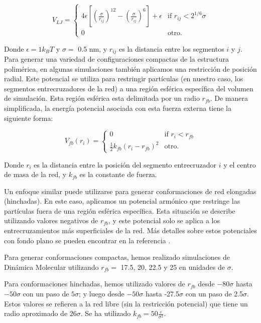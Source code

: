 \begin{equation}
	V_{LJ}=\begin{cases}
		4\epsilon \left[\left(\frac{\sigma}{r_{ij}}\right)^{12} - \left(\frac{\sigma}{r_{ij}}\right)^{6}\right] + \epsilon & \text{if $r_{ij} < 2^{1/6}\sigma$}\\
		0 & \text{otro}.
	\end{cases}
\end{equation}



Donde $\epsilon = 1 k_BT$ y $\sigma = $ 0.5 nm, y $r_{ij}$ es la distancia entre los segmentos $i$ y $j$.
Para generar una variedad de configuraciones compactas de la estructura polim\'erica, en algunas simulaciones tambi\'en aplicamos una restricci\'on de posici\'on radial.
Este potencial se utiliza para restringir part\'iculas (en nuestro caso, los segmentos entrecruzadores de la red) a una regi\'on esf\'erica espec\'ifica del volumen de simulaci\'on.
Esta regi\'on esf\'erica esta delimitada por un radio $r_{fb}$.
De manera simplificada, la energ\'ia potencial asociada con esta fuerza externa tiene la siguiente forma:

\begin{equation}
	V_{fb}(r_i)=\begin{cases}
		0 & \text{if $r_{i} < r_{fb}$}\\
		\frac{1}{2}k_{fb}\left(r_i -r_{fb}\right)^2 & \text{otro}.
	\end{cases}
\end{equation}


Donde $r_i$ es la distancia entre la posici\'on del segmento entrecruzador $i$ y el centro de masa de la red, y $k_{fb}$ es la constante de fuerza.

Un enfoque similar puede utilizarse para generar conformaciones de red elongadas (hinchadas). En este caso, aplicamos un potencial arm\'onico que restringe las part\'iculas fuera de una regi\'on esf\'erica espec\'ifica. Esta situaci\'on se describe utilizando valores negativos de $r_{fb}$, y este potencial solo se aplica a los entrecruzamientos m\'as superficiales de la red. M\'as detalles sobre estos potenciales con fondo plano se pueden encontrar en la referencia \cite{GROMACSRestraints}.

Para generar conformaciones compactas, hemos realizado simulaciones de Din\'amica Molecular utilizando $r_{fb} =$ 17.5, 20, 22.5 y 25 en unidades de $\sigma$.

Para conformaciones hinchadas, hemos utilizado valores de $r_{fb}$ desde $-80\sigma$ hasta $-50\sigma$ con un paso de $5\sigma$; y luego desde $-50\sigma$ hasta -27.5$\sigma$ con un paso de 2.5$\sigma$. Estos valores se refieren a la red libre (sin la restricci\'on potencial) que tiene un radio aproximado de $26\sigma$.
Se ha utilizado $k_{fb} = 50\frac{\varepsilon}{\sigma^2} $.



